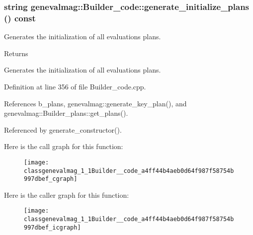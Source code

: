 \hypertarget{classgenevalmag_1_1Builder__code_a4ff44b4aeb0d64f987f58754b997dbef}{
\subsubsection[{generate\_\-initialize\_\-plans}]{\setlength{\rightskip}{0pt plus 5cm}string genevalmag::Builder\_\-code::generate\_\-initialize\_\-plans () const}}
\label{classgenevalmag_1_1Builder__code_a4ff44b4aeb0d64f987f58754b997dbef}
Generates the initialization of all evaluations plans. \begin{DoxyReturn}{Returns}

\end{DoxyReturn}
Generates the initialization of all evaluations plans. 

Definition at line 356 of file Builder\_\-code.cpp.



References b\_\-plans, genevalmag::generate\_\-key\_\-plan(), and genevalmag::Builder\_\-plans::get\_\-plans().



Referenced by generate\_\-constructor().



Here is the call graph for this function:\nopagebreak
\begin{figure}[H]
\begin{center}
\leavevmode
\texttt{[image: classgenevalmag\_1\_1Builder\_\_code\_a4ff44b4aeb0d64f987f58754b997dbef\_cgraph]}
\end{center}
\end{figure}




Here is the caller graph for this function:\nopagebreak
\begin{figure}[H]
\begin{center}
\leavevmode
\texttt{[image: classgenevalmag\_1\_1Builder\_\_code\_a4ff44b4aeb0d64f987f58754b997dbef\_icgraph]}
\end{center}
\end{figure}


